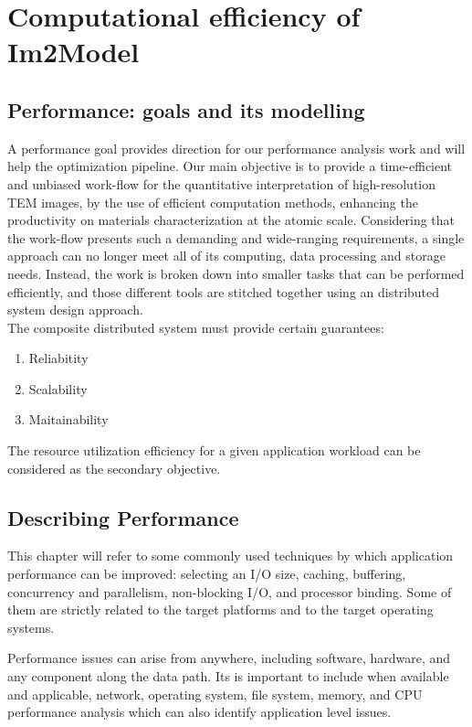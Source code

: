 \documentclass[
  oneside,
  11pt, a4paper,
  footinclude=true,
  headinclude=true,
  cleardoublepage=empty
]{scrbook}
\begin{document}
	\chapter{Computational efficiency of Im2Model}

\section{Performance: goals and its modelling} %


A performance goal provides direction for our performance analysis work and will 
help the optimization pipeline. Our main objective is to provide a time-efficient and
unbiased work-flow for the quantitative interpretation of high-resolution TEM images, by the use of
efficient computation methods, enhancing the productivity on materials characterization at the atomic
scale. Considering that the work-flow presents such a demanding and wide-ranging requirements, a single approach can no longer meet all of its computing, data processing and storage needs. 
Instead, the work is broken down into smaller tasks that can be performed efficiently, and those different tools are stitched together using an distributed system design approach.\\

The composite distributed system must provide certain guarantees:

\begin{enumerate}
				    \item Reliabitity
		    \item Scalability
		    \item Maitainability
		\end{enumerate}


The resource utilization efficiency for a given application workload
can be considered as the secondary objective.\par 





\section{Describing Performance} %

This chapter will refer to some commonly used techniques by which application performance
can be improved: selecting an I/O size, caching, buffering, concurrency
and parallelism, non-blocking I/O, and processor binding. Some of them are strictly related to the target platforms and to the target operating systems. \par 
Performance issues can arise from
anywhere, including software, hardware, and any component along the data path. Its is important to include when available and applicable, network, operating system, file system, memory, and CPU performance analysis which can also identify application level
issues.
\end{document}
